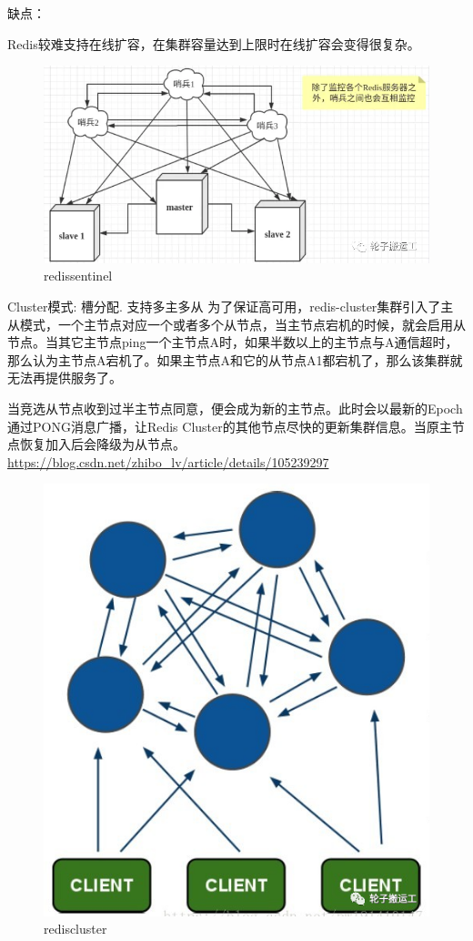 \documentclass[UTF8]{ctexart}
\begin{document}
缺点：

Redis较难支持在线扩容，在集群容量达到上限时在线扩容会变得很复杂。
\begin{figure}
	\centering
	\includegraphics[width=0.7\linewidth]{figures/redis_sentinel.png}
	\caption{redissentinel}
	\label{fig:redissentinel}
\end{figure}

Cluster模式: 槽分配. 支持多主多从
为了保证高可用，redis-cluster集群引入了主从模式，一个主节点对应一个或者多个从节点，当主节点宕机的时候，就会启用从节点。当其它主节点ping一个主节点A时，如果半数以上的主节点与A通信超时，那么认为主节点A宕机了。如果主节点A和它的从节点A1都宕机了，那么该集群就无法再提供服务了。

当竞选从节点收到过半主节点同意，便会成为新的主节点。此时会以最新的Epoch通过PONG消息广播，让Redis Cluster的其他节点尽快的更新集群信息。当原主节点恢复加入后会降级为从节点。
\url{https://blog.csdn.net/zhibo_lv/article/details/105239297}
\begin{figure}
	\centering
	\includegraphics[width=0.7\linewidth]{figures/redis_cluster.png}
	\caption{rediscluster}
	\label{fig:rediscluster}
\end{figure}
\end{document}
